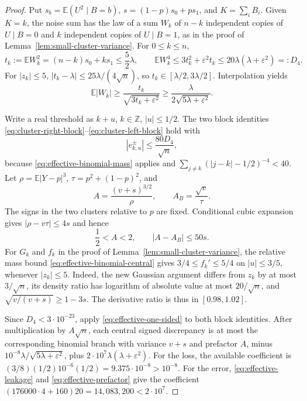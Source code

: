 \documentclass[aop]{imsart}
\theoremstyle{plain}
\theoremstyle{definition}
\theoremstyle{definition}
\newcommand{\EE}{\mathbb E}
\begin{document}
\begin{proof}
Put $s_b=\EE(U^2\mid B=b)$, $s=(1-p)s_0+ps_1$, and
$K=\sum_iB_i$.  Given $K=k$, the noise sum has the law of a sum
$W_k$ of $n-k$ independent copies of $U\mid B=0$ and $k$ independent
copies of $U\mid B=1$, as in the proof of
Lemma~\ref{lem:small-cluster-variance}.  For $0\le k\le n$,
\[
 t_k:=\EE W_k^2=(n-k)s_0+ks_1\le\frac52\lambda,\qquad
 \EE W_k^4\le3t_k^2+\varepsilon^2t_k
 \le20\lambda(\lambda+\varepsilon^2)=:D_4.
\]
For $|z_k|\le5$,
$|t_k-\lambda|\le25\lambda/(4\sqrt n)$, so
$t_k\in[\lambda/2,3\lambda/2]$.  Interpolation yields
\begin{equation}\label{eq:effective-absolute-noise}
 \EE|W_k|\ge\frac{t_k}{\sqrt{3t_k+\varepsilon^2}}
 \ge\frac{\lambda}{2\sqrt{5\lambda+\varepsilon^2}}.
\end{equation}

Write a real threshold as $k+u$, $k\in\mathbb Z$, $|u|\le1/2$.
The two block identities
\eqref{eq:cluster-right-block}--\eqref{eq:cluster-left-block}
hold with
\begin{equation}\label{eq:effective-leakage}
 |e^\pm_{k,u}|
 \le\frac{80D_4}{\sqrt n},
\end{equation}
because \eqref{eq:effective-binomial-mass} applies and
$\sum_{j\ne k}(|j-k|-1/2)^{-4}<40$.
Let $\rho=\EE|Y-p|^3$, $\tau=p^2+(1-p)^2$, and
\[
 A=\frac{(v+s)^{3/2}}{\rho},\qquad A_B=\frac{\sqrt v}{\tau}.
\]
The signs in the two clusters relative to $p$ are fixed.  Conditional
cubic expansion gives $|\rho-v\tau|\le4s$ and hence
\begin{equation}\label{eq:effective-prefactor}
 \frac12<A<2,\qquad |A-A_B|\le50s.
\end{equation}
For $G_k$ and $f_k$ in the proof of
Lemma~\ref{lem:small-cluster-variance}, the relative mass bound
\eqref{eq:effective-binomial-central} gives
$3/4\le f_k'\le5/4$ on $|u|\le3/5$, whenever $|z_k|\le5$.
Indeed, the new Gaussian argument differs from $z_k$ by at most
$3/\sqrt n$, its density ratio has logarithm of absolute value
at most $20/\sqrt n$, and $\sqrt{v/(v+s)}\ge1-3s$.
The derivative ratio is thus in $[0.98,1.02]$.

Since $D_4<3\cdot10^{-23}$, apply
\eqref{eq:effective-one-sided} to both block identities.
After multiplication by $A\sqrt n$, each central signed discrepancy
is at most the corresponding binomial branch with variance $v+s$
and prefactor $A$, minus
$10^{-8}\lambda/\sqrt{5\lambda+\varepsilon^2}$, plus
$2\cdot10^7\lambda(\lambda+\varepsilon^2)$.
For the loss, the available coefficient is
$(3/8)(1/2)10^{-6}(1/2)=9.375\cdot10^{-8}>10^{-8}$.
For the error, \eqref{eq:effective-leakage} and
\eqref{eq:effective-prefactor} give the coefficient
$(176000\cdot4+160)20=14{,}083{,}200<2\cdot10^7$.


\end{proof}
\end{document}
